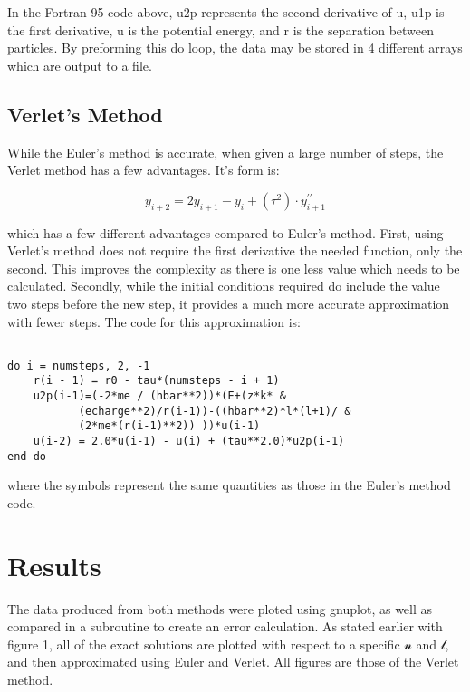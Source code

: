 \documentclass{article}
\begin{document}
\begin{multicols}{2}
In the Fortran 95 code above, u2p represents the second derivative of u, u1p is the first derivative, u is the potential energy, and r is the separation between particles. By preforming this do loop, the data may be stored in 4 different arrays which are output to a file.

\subsection{Verlet's Method}
While the Euler's method is accurate, when given a large number of steps, the Verlet method has a few advantages. It's form is:

\begin{equation}
\label{equation6}
y_{i+2} = 2y_{i+1} - y_i +(\tau^2) \cdot y^{\prime\prime}_{i+1} 
\end{equation}

which has a few different advantages compared to Euler's method. First, using Verlet's method does not require the first derivative the needed function, only the second. This improves the complexity as there is one less value which needs to be calculated. Secondly, while the initial conditions required do include the value two steps before the new step, it provides a much more accurate approximation with fewer steps. The code for this approximation is:

\small{
\begin{verbatim}

do i = numsteps, 2, -1
    r(i - 1) = r0 - tau*(numsteps - i + 1)    
    u2p(i-1)=(-2*me / (hbar**2))*(E+(z*k* &
           (echarge**2)/r(i-1))-((hbar**2)*l*(l+1)/ &
           (2*me*(r(i-1)**2)) ))*u(i-1)
    u(i-2) = 2.0*u(i-1) - u(i) + (tau**2.0)*u2p(i-1)       
end do

\end{verbatim}
}

where the symbols represent the same quantities as those in the Euler's method code.

\section{Results}
The data produced from both methods were ploted using gnuplot, as well as compared in a subroutine to create an error calculation. As stated earlier with figure 1, all of the exact solutions are plotted with respect to a specific $\mathcal{n}$ and $\mathcal{l}$, and then approximated using Euler and Verlet. All figures are those of the Verlet method.

\vspace{0.1in}

\end{multicols}
\end{document}
